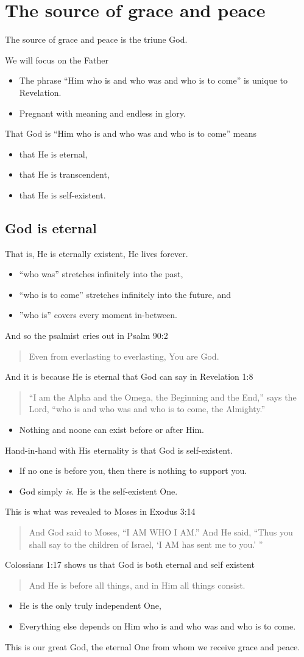 \documentclass[12pt]{article}
\newcommand{\BI}{\begin{itemize}}
\newcommand{\EI}{\end{itemize}}
\newcommand{\I}{\item}
\newcommand{\Q}[1]{\begin{quote} #1 \end{quote}}
\begin{document}
\section{The source of grace and peace}
\I  The source of grace and peace is the triune God.
\I  We will focus on the Father
\BI \I  The phrase ``Him who is and who was and who is to come'' is unique to Revelation.
    \I  Pregnant with meaning and endless in glory. \EI
\I  That God is ``Him who is and who was and who is to come'' means
\BI \I  that He is eternal,
    \I  that He is transcendent,
    \I  that He is self-existent. \EI

\subsection{God is eternal}
\I  That is, He is eternally existent, He lives forever.
\BI \I  ``who was'' stretches infinitely into the past,
    \I  ``who is to come'' stretches infinitely into the future, and
    \I  ''who is'' covers every moment in-between. \EI
\I  And so the psalmist cries out in Psalm 90:2 \Q{Even from everlasting to everlasting, You are God.}
\I  And it is because He is eternal that God can say in Revelation 1:8
    \Q{``I am the Alpha and the Omega, the Beginning and the End,''
        says the Lord, ``who is and who was and who is to come, the Almighty.''}
\BI \I  Nothing and noone can exist before or after Him. \EI

\I  Hand-in-hand with His eternality is that God is self-existent.
\BI \I  If no one is before you, then there is nothing to support you.
    \I  God simply \emph{is}. He is the self-existent One. \EI
\I  This is what was revealed to Moses in Exodus 3:14 
    \Q{And God said to Moses, ``I AM WHO I AM.'' And He said, 
    ``Thus you shall say to the children of Israel, `I AM has sent me to you.' ''}
\I  Colossians 1:17 shows us that God is both eternal and self existent
    \Q{And He is before all things, and in Him all things consist.}
\BI \I  He is the only truly independent One,
    \I  Everything else depends on Him who is and who was and who is to come. \EI
\I  This is our great God, the eternal One from whom we receive grace and peace.
\end{document}
